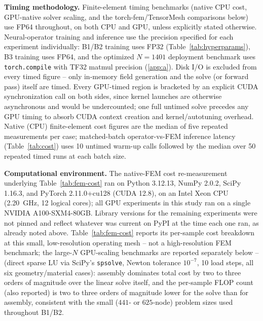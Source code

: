 \documentclass[final,5p,times]{elsarticle}
\begin{document}
\textbf{Timing methodology.} Finite-element timing benchmarks (native
CPU cost, GPU-native solver scaling, and the torch-fem/TensorMesh
comparisons below) use FP64 throughout, on both CPU and GPU, unless
explicitly stated otherwise. Neural-operator training and inference use
the precision specified for each experiment individually: B1/B2 training
uses FP32 (Table~\ref{tab:hyperparams}), B3 training uses FP64, and the
optimized $N{=}1401$ deployment benchmark uses \texttt{torch.compile}
with TF32 matmul precision (\ref{app:a}). Disk I/O is excluded
from every timed figure -- only in-memory field generation and the
solve (or forward pass) itself are timed. Every GPU-timed region is
bracketed by an explicit CUDA synchronization call on both sides, since
kernel launches are otherwise asynchronous and would be undercounted; one
full untimed solve precedes any GPU timing to absorb CUDA context creation
and kernel/autotuning overhead. Native (CPU) finite-element cost figures
are the median of five repeated measurements per case; matched-batch
operator-vs-FEM inference latency (Table~\ref{tab:cost}) uses 10 untimed
warm-up calls followed by the median over 50 repeated timed runs at each
batch size.

\textbf{Computational environment.} The native-FEM cost re-measurement
underlying Table~\ref{tab:fem-cost} ran on Python 3.12.13, NumPy 2.0.2,
SciPy 1.16.3, and PyTorch 2.11.0+cu128 (CUDA 12.8), on an Intel Xeon CPU
(2.20~GHz, 12 logical cores); all GPU experiments in this study ran on a
single NVIDIA A100-SXM4-80GB. Library versions for the remaining
experiments were not pinned and reflect whatever was current on PyPI at
the time each one ran, as already noted above.
Table~\ref{tab:fem-cost}
reports its per-sample cost breakdown at this small, low-resolution
operating mesh -- not a high-resolution FEM benchmark; the large-$N$
GPU-scaling benchmarks are reported separately below -- (direct sparse
LU via SciPy's \texttt{spsolve}, Newton tolerance $10^{-7}$, 10 load
steps, all six geometry/material cases): assembly dominates total cost
by two to three orders of magnitude over the linear solve itself, and
the per-sample FLOP count (also reported) is two to three orders of
magnitude lower for the solve than for assembly, consistent with the
small ($441$- or $625$-node) problem sizes used throughout B1/B2.
\end{document}
